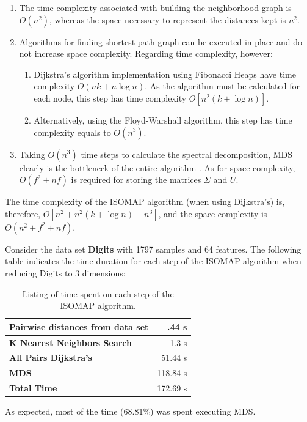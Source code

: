 \begin{enumerate}
	\item The time complexity associated with building the neighborhood graph is $O(n^2)$, whereas the space necessary to represent the distances kept is $n^2$.
	\item Algorithms for finding shortest path graph can be executed in-place and do not increase space complexity. Regarding time complexity, however:
	\begin{enumerate}
		\item Dijkstra's algorithm implementation using Fibonacci Heaps have time complexity $O(nk + n \log n)$. As the algorithm must be calculated for each node, this step has time complexity $O[n^2(k + \log n)]$.
		\item Alternatively, using the Floyd-Warshall algorithm, this step has time complexity equals to $O(n^3)$.
	\end{enumerate}
	\item Taking $O(n^3)$ time steps to calculate the spectral decomposition, MDS clearly is the bottleneck of the entire algorithm \cite{cay2005, silva2002global}. As for space complexity, $O(f^2 + nf)$ is required for storing the matrices $\Sigma$ and $U$.
\end{enumerate}

The time complexity of the ISOMAP algorithm (when using Dijkstra's) is, therefore, $O[n^2 + n^2(k + \log n) + n^3]$, and the space complexity is $O(n^2 + f^2 + nf)$.

\begin{experiment}
	Consider the data set \textbf{Digits} with 1797 samples and 64 features. The following table indicates the time duration for each step of the ISOMAP algorithm when reducing Digits to 3 dimensions:

	\begin{table}[H]
		\centering
		\begin{tabular}{|l|r|}
			\hline
			\textbf{Pairwise distances from data set} & .44 s \\\hline
			\textbf{K Nearest Neighbors Search} & 1.3 s \\\hline
			\textbf{All Pairs Dijkstra's} & 51.44 s\\\hline
			\textbf{MDS} & 118.84 s \\\hline
			\textbf{Total Time} & 172.69 s \\\hline
		\end{tabular}

		\caption{Listing of time spent on each step of the ISOMAP algorithm.}
	\end{table}

	As expected, most of the time (68.81\%) was spent executing MDS.
\end{experiment}

